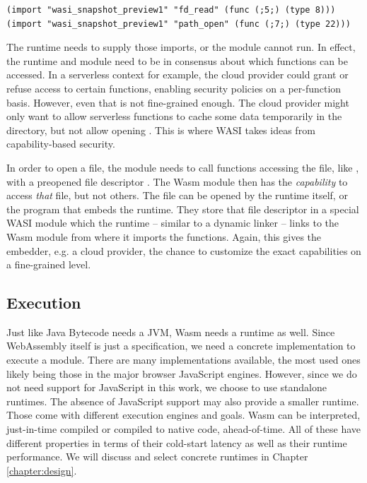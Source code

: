 \begin{verbatim}
(import "wasi_snapshot_preview1" "fd_read" (func (;5;) (type 8)))
(import "wasi_snapshot_preview1" "path_open" (func (;7;) (type 22)))
\end{verbatim}

The runtime needs to supply those imports, or the module cannot run. In effect, the runtime and module need to be in consensus about which functions can be accessed. In a serverless context for example, the cloud provider could grant or refuse access to certain functions, enabling security policies on a per-function basis. However, even that is not fine-grained enough. The cloud provider might only want to allow serverless functions to cache some data temporarily in the  directory, but not allow opening . This is where WASI takes ideas from capability-based security.

In order to open a file, the module needs to call functions accessing the file, like , with a preopened file descriptor \cite{Clark2019}. The Wasm module then has the \emph{capability} to access \emph{that} file, but not others. The file can be opened by the runtime itself, or the program that embeds the runtime. They store that file descriptor in a special WASI module which the runtime -- similar to a dynamic linker -- links to the Wasm module from where it imports the functions. Again, this gives the embedder, e.g. a cloud provider, the chance to customize the exact capabilities on a fine-grained level.

\subsection{Execution}

Just like Java Bytecode needs a JVM, Wasm needs a runtime as well. Since WebAssembly itself is just a specification, we need a concrete implementation to execute a module. There are many implementations available, the most used ones likely being those in the major browser JavaScript engines. However, since we do not need support for JavaScript in this work, we choose to use standalone runtimes. The absence of JavaScript support may also provide a smaller runtime. Those come with different execution engines and goals. Wasm can be interpreted, just-in-time compiled or compiled to native code, ahead-of-time. All of these have different properties in terms of their cold-start latency as well as their runtime performance. We will discuss and select concrete runtimes in Chapter \ref{chapter:design}.

